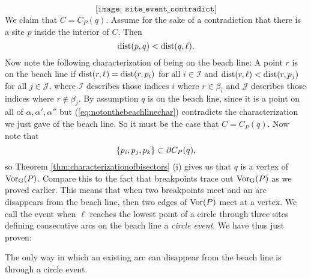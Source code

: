 \[
    \texttt{[image: site\_event\_contradict]} %
\]
We claim that $C = C_P(q)$. Assume for the sake of a contradiction that there is a site $p$ inside the interior of $C$. Then
\begin{equation} \label{eq:notonthebeachlinechar}
    \operatorname{dist}(p, q) < \operatorname{dist}(q, \ell).
\end{equation}
Now note the following characterization of being on the beach line: A point $r$ is on the beach line if $\operatorname{dist}(r, \ell) = \operatorname{dist}(r, p_i)$ for all $i \in \mathcal{I}$ and $\operatorname{dist}(r, \ell) < \operatorname{dist}(r, p_j)$ for all $j \in \mathcal{J}$, where $\mathcal{I}$ describes those indices $i$ where $r \in \beta_i$ and $\mathcal{J}$ describes those indices where $r \not\in \beta_j$. By assumption $q$ is on the beach line, since it is a point on all of $\alpha, \alpha', \alpha''$ but (\ref{eq:notonthebeachlinechar}) contradicts the characterization we just gave of the beach line. So it must be the case that $C = C_P(q)$. Now note that
\[
    \{p_i, p_j, p_k\} \subset \partial C_P(q),
\]
so Theorem \ref{thm:characterizationofbisectors} (i) gives us that $q$ is a vertex of $\operatorname{Vor_{G}}(P)$. Compare this to the fact that breakpoints trace out $\operatorname{Vor_{G}}(P)$ as we proved earlier. This means that when two breakpoints meet and an arc disappears from the beach line, then two edges of $\operatorname{Vor}(P)$ meet at a vertex. We call the event when $\ell$ reaches the lowest point of a circle through three sites defining consecutive arcs on the beach line a \emph{circle event}. We have thus just proven:
\begin{lem}
The only way in which an existing arc can disappear from the beach line is through a circle event.
\end{lem}

